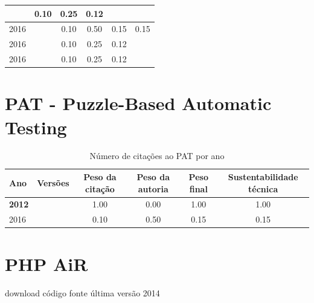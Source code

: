 \begin{table}[H]
\begin{tabular}{| l | c | c | c | c | c |}
          &
          0.10
          &
          0.25
          &
          0.12
          &
          \\
\hline
            2016
          &
          
          &
          0.10
          &
          0.50
          &
          0.15
          &
            {\color{red} 0.15}
          \\
            2016
          &
          
          &
          0.10
          &
          0.25
          &
          0.12
          &
          \\
            2016
          &
          
          &
          0.10
          &
          0.25
          &
          0.12
          &
          \\
\hline
\end{tabular}
\end{table}



\section{PAT - Puzzle-Based Automatic Testing}


\begin{table}[H]
\caption{Número de citações ao PAT  por ano}
\centering
\begin{tabular}{| l | c | c | c | c | c |}
  \hline
  Ano & Versões & Peso da citação & Peso da autoria & Peso final & Sustentabilidade técnica \\
  \hline
            {\bf 2012}
          &
          
          &
          1.00
          &
          0.00
          &
          1.00
          &
            {\color{blue} 1.00}
          \\
\hline
            2016
          &
          
          &
          0.10
          &
          0.50
          &
          0.15
          &
            {\color{red} 0.15}
          \\
\hline
\end{tabular}
\end{table}



\section{PHP AiR}
\checkmark download
\checkmark código fonte
\checkmark última versão 2014


